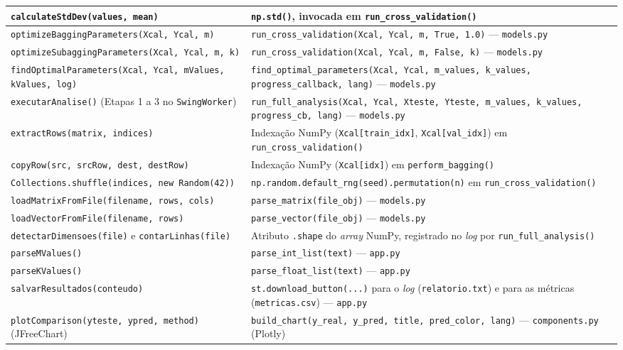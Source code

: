 \begin{quadro}[ht]
\begin{center}
\begin{threeparttable}
\begin{tabularx}{\textwidth}{|>{\raggedright\arraybackslash}X|>{\raggedright\arraybackslash}X|}
\texttt{calculateStdDev(values, mean)} & \texttt{np.std()}, invocada em \texttt{run\_cross\_validation()} \\ \hline
\texttt{optimizeBaggingParameters(Xcal, Ycal, m)} & \texttt{run\_cross\_validation(Xcal, Ycal, m, True, 1.0)} --- \texttt{models.py} \\ \hline
\texttt{optimizeSubaggingParameters(Xcal, Ycal, m, k)} & \texttt{run\_cross\_validation(Xcal, Ycal, m, False, k)} --- \texttt{models.py} \\ \hline
\texttt{findOptimalParameters(Xcal, Ycal, mValues, kValues, log)} & \texttt{find\_optimal\_parameters(Xcal, Ycal, m\_values, k\_values, progress\_callback, lang)} --- \texttt{models.py} \\ \hline
\texttt{executarAnalise()} (Etapas 1 a 3 no \texttt{SwingWorker}) & \texttt{run\_full\_analysis(Xcal, Ycal, Xteste, Yteste, m\_values, k\_values, progress\_cb, lang)} --- \texttt{models.py} \\ \hline
\texttt{extractRows(matrix, indices)} & Indexação NumPy (\texttt{Xcal[train\_idx]}, \texttt{Xcal[val\_idx]}) em \texttt{run\_cross\_validation()} \\ \hline
\texttt{copyRow(src, srcRow, dest, destRow)} & Indexação NumPy (\texttt{Xcal[idx]}) em \texttt{perform\_bagging()} \\ \hline
\texttt{Collections.shuffle(indices, new Random(42))} & \texttt{np.random.default\_rng(seed).permutation(n)} em \texttt{run\_cross\_validation()} \\ \hline
\texttt{loadMatrixFromFile(filename, rows, cols)} & \texttt{parse\_matrix(file\_obj)} --- \texttt{models.py} \\ \hline
\texttt{loadVectorFromFile(filename, rows)} & \texttt{parse\_vector(file\_obj)} --- \texttt{models.py} \\ \hline
\texttt{detectarDimensoes(file)} e \texttt{contarLinhas(file)} & Atributo \texttt{.shape} do \textit{array} NumPy, registrado no \textit{log} por \texttt{run\_full\_analysis()} \\ \hline
\texttt{parseMValues()} & \texttt{parse\_int\_list(text)} --- \texttt{app.py} \\ \hline
\texttt{parseKValues()} & \texttt{parse\_float\_list(text)} --- \texttt{app.py} \\ \hline
\texttt{salvarResultados(conteudo)} & \texttt{st.download\_button(...)} para o \textit{log} (\texttt{relatorio.txt}) e para as métricas (\texttt{metricas.csv}) --- \texttt{app.py} \\ \hline
\texttt{plotComparison(yteste, ypred, method)} (JFreeChart) & \texttt{build\_chart(y\_real, y\_pred, title, pred\_color, lang)} --- \texttt{components.py} (Plotly) \\ \hline

\end{tabularx}
\end{threeparttable}
\end{center}
\end{quadro}
